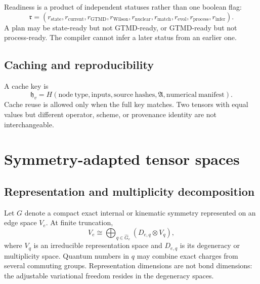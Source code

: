 \documentclass[11pt]{article}
\newcommand{\GTMD}{\ensuremath{\mathrm{GTMD}}}
\newcommand{\Aset}{\mathfrak A}
\begin{document}
Readiness is a product of independent statuses rather than one boolean flag:
\begin{equation}
 \mathfrak r=
 \left(
 r_{\mathrm{state}},
 r_{\mathrm{current}},
 r_{\GTMD},
 r_{\mathrm{Wilson}},
 r_{\mathrm{nuclear}},
 r_{\mathrm{match}},
 r_{\mathrm{evol}},
 r_{\mathrm{process}},
 r_{\mathrm{infer}}
 \right).
\label{eq:readiness-product}
\end{equation}
A plan may be state-ready but not GTMD-ready, or GTMD-ready but not
process-ready.  The compiler cannot infer a later status from an earlier one.

\subsection{Caching and reproducibility}

A cache key is
\begin{equation}
 \mathfrak h_v=
 H\left(
 \mathrm{node\ type},
 \mathrm{inputs},
 \mathrm{source\ hashes},
 \Aset,
 \mathrm{numerical\ manifest}
 \right).
\label{eq:cache-key}
\end{equation}
Cache reuse is allowed only when the full key matches.  Two tensors with equal
values but different operator, scheme, or provenance identity are not
interchangeable.

\section{Symmetry-adapted tensor spaces}
\label{sec:symmetric-tensors}

\subsection{Representation and multiplicity decomposition}

Let \(G\) denote a compact exact internal or kinematic symmetry represented on
an edge space \(V_e\).  At finite truncation,
\begin{equation}
 V_e
 \cong
 \bigoplus_{q\in\widehat G_e}
 \left(
 D_{e,q}\otimes V_q
 \right),
\label{eq:edge-rep-decomposition}
\end{equation}
where \(V_q\) is an irreducible representation space and \(D_{e,q}\) is its
degeneracy or multiplicity space.  Quantum numbers in \(q\) may combine exact
charges from several commuting groups.  Representation dimensions are not
bond dimensions: the adjustable variational freedom resides in the degeneracy
spaces.
\end{document}
